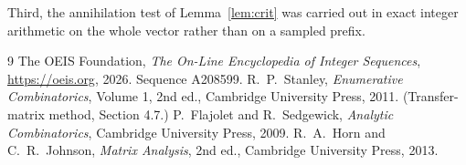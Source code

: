 \documentclass[11pt,a4paper]{article}
\theoremstyle{plain}
\theoremstyle{definition}
\begin{document}
Third, the annihilation test of Lemma~\ref{lem:crit} was carried out in exact integer
arithmetic on the whole vector rather than on a sampled prefix.

\begin{thebibliography}{9}
 The OEIS Foundation, \emph{The On-Line Encyclopedia of Integer
Sequences}, \url{https://oeis.org}, 2026. Sequence A208599.
 R.~P.~Stanley, \emph{Enumerative Combinatorics}, Volume 1, 2nd ed.,
Cambridge University Press, 2011. (Transfer-matrix method, Section 4.7.)
 P.~Flajolet and R.~Sedgewick, \emph{Analytic Combinatorics}, Cambridge
University Press, 2009.
 R.~A.~Horn and C.~R.~Johnson, \emph{Matrix Analysis}, 2nd ed., Cambridge
University Press, 2013.
\end{thebibliography}
\end{document}
